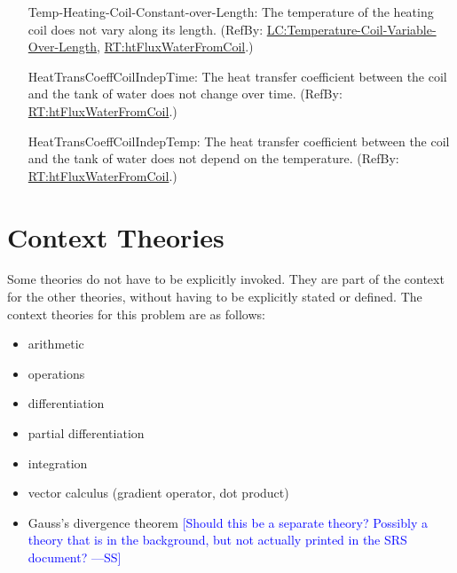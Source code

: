 \documentclass[12pt]{article}
\newcommand{\authornote}[3]{\textcolor{#1}{[#3 ---#2]}}
\newcommand{\authornote}[3]{}
\newcommand{\wss}[1]{\authornote{blue}{SS}{#1}}
\begin{document}
\begin{itemize}
\item[Temp-Heating-Coil-Constant-over-Length:\phantomsection\label{assumpTHCCoL}]{The
temperature of the heating coil does not vary along its length. (RefBy:
\hyperref[likeChgTCVOL]{LC:Temperature-Coil-Variable-Over-Length},
\hyperref[RT:htFluxWaterFromCoil]{RT:htFluxWaterFromCoil}.)}

\item[HeatTransCoeffCoilIndepTime:\phantomsection\label{assumpHeatTransCoilIndepTime}]
{The heat transfer coefficient between the coil and the tank of water does not
change over time. (RefBy:
\hyperref[RT:htFluxWaterFromCoil]{RT:htFluxWaterFromCoil}.)}

\item[HeatTransCoeffCoilIndepTemp:\phantomsection\label{assumpHeatTransCoilIndepTemp}]
{The heat transfer coefficient between the coil and the tank of water does not
depend on the temperature. (RefBy:
\hyperref[RT:htFluxWaterFromCoil]{RT:htFluxWaterFromCoil}.)}

\end{itemize}


\section{Context Theories}

Some theories do not have to be explicitly invoked.  They are part of the
context for the other theories, without having to be explicitly stated or
defined.  The context theories for this problem are as follows: 

\begin{itemize}
  \item arithmetic
  \item operations 
  \item differentiation
  \item partial differentiation
  \item integration
  \item vector calculus (gradient operator, dot product)
  \item Gauss's divergence theorem \wss{Should this be a separate theory?
  Possibly a theory that is in the background, but not actually printed in the
  SRS document?}
\end{itemize}

\end{document}
